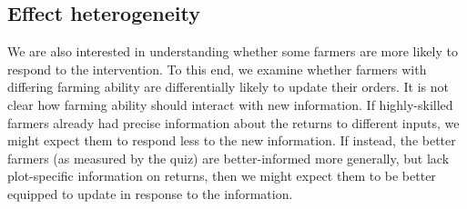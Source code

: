 \documentclass[12pt,letterpaper]{article}
\begin{document}



\subsection{Effect heterogeneity}\label{subsec:effect_heterogeneity}

We are also interested in understanding whether some farmers are more likely to respond to the intervention. To this end, we examine whether farmers with differing farming ability are differentially likely to update their orders. It is not clear how farming ability should interact with new information. If highly-skilled farmers already had precise information about the returns to different inputs, we might expect them to respond less to the new information. If instead, the better farmers (as measured by the quiz) are better-informed more generally, but lack plot-specific information on returns, then we might expect them to be better equipped to update in response to the information. 
\end{document}
